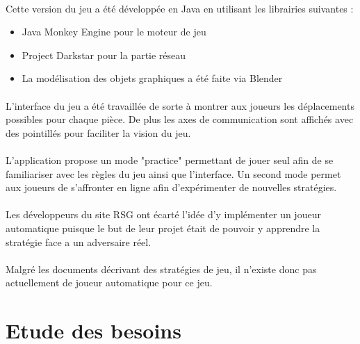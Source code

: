 \documentclass[12pt]{article}
\begin{document}
		\paragraph{}
		Cette version du jeu a été développée en Java en utilisant les librairies suivantes :
		
		\begin{itemize}
			\item Java Monkey Engine pour le moteur de jeu
			\item Project Darkstar pour la partie réseau
			\item La modélisation des objets graphiques a été faite via Blender
		\end{itemize}

		\paragraph{}
		L'interface du jeu a été travaillée de sorte à montrer aux joueurs les déplacements possibles pour chaque pièce. De plus les axes de 
		communication sont affichés avec des pointillés pour faciliter la vision du jeu.
		
		\paragraph{}
		L'application propose un mode "practice" permettant de jouer seul afin de se familiariser avec les règles du jeu ainsi que l'interface.
		Un second mode permet aux joueurs de s'affronter en ligne afin d'expérimenter de nouvelles stratégies.
		
		\paragraph{}
		Les développeurs du site RSG ont écarté l'idée d'y implémenter un joueur automatique puisque le but de leur projet était de 
		pouvoir y apprendre la stratégie face a un adversaire réel.
		
		\paragraph{}
		Malgré les documents décrivant des stratégies de jeu, il n'existe donc pas actuellement de joueur automatique pour ce jeu.
		
		\clearpage

	\section{Etude des besoins}    
\end{document}
